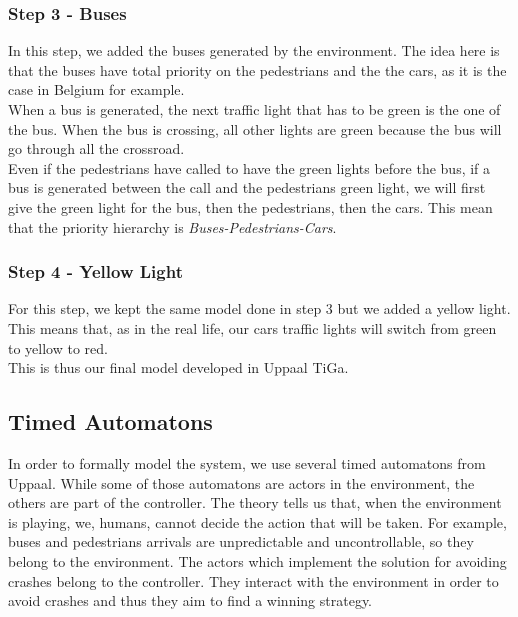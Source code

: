 \subsubsection{Step 3 - Buses}
In this step, we added the buses generated by the environment. The idea here is that the buses have total priority on the pedestrians and the the cars, as it is the case in Belgium for example. \\
When a bus is generated, the next traffic light that has to be green is the one of the bus. When the bus is crossing, all other lights are green because the bus will go through all the crossroad. \\
Even if the pedestrians have called to have the green lights before the bus, if a bus is generated between the call and the pedestrians green light, we will first give the green light for the bus, then the pedestrians, then the cars. This mean that the priority hierarchy is \textit{Buses-Pedestrians-Cars}. 

\subsubsection{Step 4 - Yellow Light}
For this step, we kept the same model done in step 3 but we added a yellow light. This means that, as in the real life, our cars traffic lights will switch from green to yellow to red. \\
This is thus our final model developed in Uppaal TiGa.

\subsection{Timed Automatons}
In order to formally model the system, we use several timed automatons from Uppaal. While some of those automatons are actors in the environment, the others are part of the controller.
The theory tells us that, when the environment is playing, we, humans, cannot decide the action that will be taken. For example, buses and pedestrians arrivals are unpredictable and uncontrollable, so they belong to the environment.
The actors which implement the solution for avoiding crashes belong to the controller. They interact with the environment in order to avoid crashes and thus they aim to find a winning strategy.
